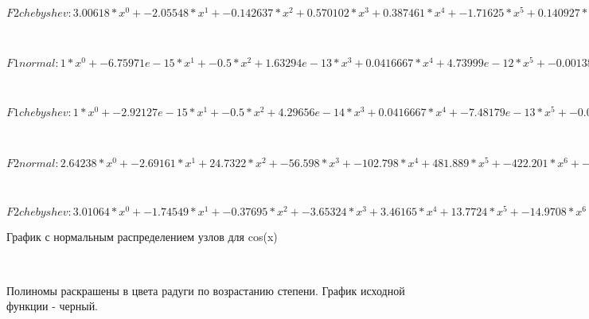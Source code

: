 \documentclass[]{article}
\begin{document}
~

$F2 chebyshev : 3.00618 * x^0 + -2.05548 * x^1 + -0.142637 * x^2 + 0.570102 * x^3 + 0.387461 * x^4 + -1.71625 * x^5 + 0.140927 * x^6 + 1.80175 * x^7 + -1.03085 * x^8 + -0.331007 * x^9 + 0.569175 * x^10 + -0.26931 * x^11 + 0.0678755 * x^12 + -0.00986313 * x^13 + 0.000782573 * x^14 + -2.63726e-05*x^15
$

~

$F1 normal : 1 * x^0 + -6.75971e-15 * x^1 + -0.5 * x^2 + 1.63294e-13 * x^3 + 0.0416667 * x^4 + 4.73999e-12 * x^5 + -0.00138889 * x^6 + 1.11751e-11 * x^7 + 2.48016e-05 * x^8 + 1.27456e-11 * x^9 + -2.75581e-07 * x^10 + 4.79469e-12 * x^11 + 2.08557e-09 * x^12 + 1.14262e-13 * x^13 + -1.14815e-11 * x^14 + 7.87118e-14 * x^15 + 4.23875e-14 * x^16 + -8.09123e-16 * x^17 + 1.65506e-17 * x^18 + -7.73169e-18 * x^19 + 1.77017e-19*x^20
$

~

$F1 chebyshev : 1 * x^0 + -2.92127e-15 * x^1 + -0.5 * x^2 + 4.29656e-14 * x^3 + 0.0416667 * x^4 + -7.48179e-13 * x^5 + -0.00138889 * x^6 + 1.9984e-13 * x^7 + 2.48016e-05 * x^8 + 8.84626e-13 * x^9 + -2.75572e-07 * x^10 + 8.79297e-14 * x^11 + 2.08751e-09 * x^12 + -2.88658e-14 * x^13 + -1.15331e-11 * x^14 + 2.2593e-14 * x^15 + 4.12309e-14 * x^16 + 1.26548e-15 * x^17 + -3.23634e-16 * x^18 + 1.37694e-17 * x^19 + -1.67501e-19*x^20
$

~

$F2 normal : 2.64238 * x^0 + -2.69161 * x^1 + 24.7322 * x^2 + -56.598 * x^3 + -102.798 * x^4 + 481.889 * x^5 + -422.201 * x^6 + -468.827 * x^7 + 1252.79 * x^8 + -946.802 * x^9 + -13.6822 * x^10 + 621.136 * x^11 + -606.714 * x^12 + 335.935 * x^13 + -125.42 * x^14 + 33.1502 * x^15 + -6.2548 * x^16 + 0.827495 * x^17 + -0.0731244 * x^18 + 0.0038828 * x^19 + -9.37875e-05*x^20$

~

$F2 chebyshev : 3.01064 * x^0 + -1.74549 * x^1 + -0.37695 * x^2 + -3.65324 * x^3 + 3.46165 * x^4 + 13.7724 * x^5 + -14.9708 * x^6 + -17.7018 * x^7 + 28.8814 * x^8 + 0.629151 * x^9 + -21.5198 * x^10 + 13.1076 * x^11 + 1.03142 * x^12 + -5.22888 * x^13 + 3.25832 * x^14 + -1.12931 * x^15 + 0.251973 * x^16 + -0.0371786 * x^17 + 0.00352748 * x^18 + -0.000195802 * x^19 + 4.84744e-06*x^20$
\newpage

График с нормальным распределением узлов для cos(x)

~

Полиномы раскрашены в цвета радуги по возрастанию степени.
График исходной функции - черный.
\end{document}
